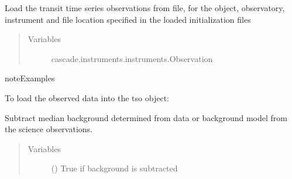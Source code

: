 \documentclass[a4paper,10pt,english]{sphinxmanual}
\begin{document}
\begin{fulllineitems}
\begin{fulllineitems}
\end{fulllineitems}


\begin{fulllineitems}
\label{\detokenize{cascade.TSO:cascade.TSO.TSO.TSOSuite.load_data}}
Load the transit time series observations from file, for the
object, observatory, instrument and file location specified in the
loaded initialization files
\begin{quote}\begin{description}
\item[{Variables}] \leavevmode
{} \textendash{} cascade.instruments.instruments.Observation

\end{description}\end{quote}

\begin{sphinxadmonition}{note}{Examples}

To load the observed data into the tso object:

%
\begin{sphinxVerbatim}[commandchars=\\\{\}]
\end{sphinxVerbatim}
\end{sphinxadmonition}

\end{fulllineitems}


\begin{fulllineitems}
\label{\detokenize{cascade.TSO:cascade.TSO.TSO.TSOSuite.subtract_background}}
Subtract median background determined from data or background model
from the science observations.
\begin{quote}\begin{description}
\item[{Variables}] \leavevmode
{} () \textendash{} True if background is subtracted


\end{description}
\end{quote}
\end{fulllineitems}
\end{fulllineitems}
\end{document}
